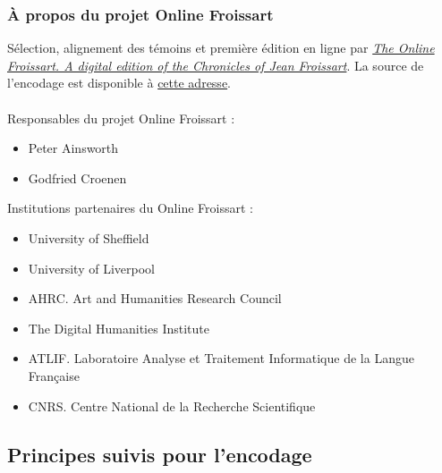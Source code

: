 \documentclass[12pt, a4paper]{article}
\begin{document}
        
        \subsubsection{À propos du projet Online Froissart}
        Sélection, alignement des témoins et première édition en ligne par \href{https://www.dhi.ac.uk/onlinefroissart}{\textit{The Online Froissart. A digital edition of the Chronicles of Jean Froissart}}. La source de l'encodage est disponible à \href{https://www.dhi.ac.uk/onlinefroissart/browsey.jsp?f=b&pb2=Ber-3_SHF_3A-307&disp2=shf&GlobalWord=0&div2=ms.f.transc.Ber-3&div1=ms.f.transc.Bre-3&div0=ms.f.transc.Ant-3&panes=3&GlobalMode=shf&img0=&disp0=shf&disp1=shf&pb1=Bre-3_SHF_3A-307&img2=&GlobalShf=3A-306&pb0=Ant-3_SHF_3A-307&img1=}{cette adresse}.\\~\\
        \noindent Responsables du projet Online Froissart : \begin{itemize}\item{
            Peter
            Ainsworth
          } \item{
            Godfried
            Croenen
          } \end{itemize} \noindent Institutions partenaires du Online Froissart : \begin{itemize}\item{University of Sheffield} \item{University of Liverpool} \item{AHRC. Art and Humanities Research Council} \item{The Digital Humanities Institute} \item{ATLIF. Laboratoire Analyse et Traitement Informatique de la Langue Française} \item{CNRS. Centre National de la Recherche Scientifique} \end{itemize} 
                \subsection{Principes suivis pour l'encodage}
\end{document}
